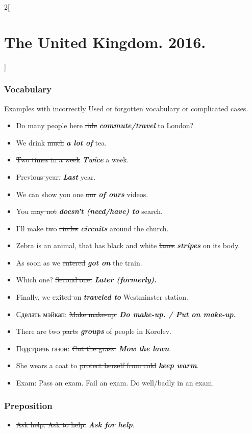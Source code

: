 \documentclass[10pt,a4paper]{article}
\newlength{\OriginalParIndent}
\newcommand\ex[1]{\textit{\textbf{{#1}}}}           %
\newenvironment{ItemizeWithOrigParIndent}
    {\begin{itemize}[leftmargin=\OriginalParIndent]}
    {\end{itemize}}
\begin{document}
\begin{multicols}{2}[\section{The United Kingdom. 2016.}]
\subsubsection{Vocabulary}
Examples with incorrectly Used or forgotten vocabulary or complicated cases.
\begin{ItemizeWithOrigParIndent}
   \item Do many people here \sout{ride} \ex{commute/travel} to London?
   \item We drink \sout{much} \ex{a lot of} tea.
   \item \sout{Two times in a week} \ex{Twice} a week.
   \item \sout{Previous year.} \ex{Last} year.
   \item We can show you one \sout{our} \ex{of ours} videos.
   \item You \sout{may not} \ex{doesn't (need/have) to} search.
   \item I'll make two \sout{circles} \ex{circuits} around the church.
   \item Zebra is an animal, that has black and white \sout{lanes} \ex{stripes} on its body.
   \item As soon as we \sout{entered} \ex{got on} the train.
   \item Which one? \sout{Second one.} \ex{Later (formerly).}
   \item Finally, we \sout{exited on} \ex{traveled to} Westminster station.
   \item Сделать мэйкап: \sout{Make make-up.} \ex{Do make-up. / Put on make-up.}
   \item There are two \sout{parts} \ex{groups} of people in Korolev.
   \item Подстричь газон: \sout{Cut the grass.} \ex{Mow the lawn}.
   \item She wears a coat to \sout{protect herself from cold} \ex{keep warm}.
   \item Exam: Pass an exam. Fail an exam. Do well/badly in an exam.
\end{ItemizeWithOrigParIndent}

\subsubsection{Preposition}
\begin{ItemizeWithOrigParIndent}
   \item \sout{Ask help. Ask to help.} \ex{Ask for help}.
\end{ItemizeWithOrigParIndent}


\end{multicols}
\end{document}
